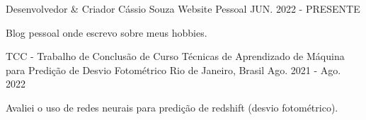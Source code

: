 

\begin{cventries}

  \cventry
    {Desenvolvedor \& Criador} %
    {Cássio Souza} %
    {Website Pessoal} %
    {JUN. 2022 - PRESENTE} %
    {
      \begin{cvitems} %
        \item {Blog pessoal onde escrevo sobre meus hobbies.}
      \end{cvitems}
    }

  \cventry
    {TCC - Trabalho de Conclusão de Curso} %
    {Técnicas de Aprendizado de Máquina para Predição de Desvio Fotométrico} %
    {Rio de Janeiro, Brasil} %
    {Ago. 2021 - Ago. 2022} %
    {
      \begin{cvitems} %
        \item {Avaliei o uso de redes neurais para predição de redshift (desvio fotométrico).}
      \end{cvitems}
    }

\end{cventries}

